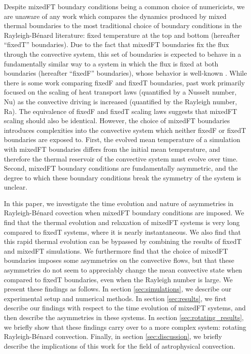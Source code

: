 \documentclass[aps, pre, onecolumn, nofootinbib, notitlepage, groupedaddress, amsfonts, amssymb, amsmath, longbibliography]{revtex4-1}
\newcommand{\RB}{Rayleigh-B\'{e}nard }
\begin{document}
Despite mixedFT boundary conditions being a common choice of numericists, we are unaware of any work which compares the dynamics produced by mixed thermal boundaries to the most traditional choice of boundary conditions in the \RB literature: fixed temperature at the top and bottom (hereafter ``fixedT'' boundaries).
Due to the fact that mixedFT boundaries fix the flux through the convective system, this set of boundaries is expected to behave in a fundamentally similar way to a system in which the flux is fixed at both boundaries (hereafter ``fixedF'' boundaries), whose behavior is well-known \cite{otero&all2002, goluskin2015}.
While there is some work \cite{johnston&doering2009} comparing fixedF and fixedT boundaries, past work primarily focused on the scaling of heat transport laws (quantified by a Nusselt number, Nu) as the convective driving is increased (quantified by the Rayleigh number, Ra).
The equivalence of fixedF and fixedT scaling laws suggests that mixedFT scaling should also be identical.
However, the choice of mixedFT boundaries introduces complexities into the convective system which neither fixedF or fixedT boundaries are exposed to.
First, the evolved mean temperature of a simulation with mixedFT boundaries differs from the initial mean temperature, and therefore the thermal reservoir of the convective system must evolve over time.
Second, mixedFT boundary conditions are fundamentally asymmetric, and the degree to which these boundary conditions break the symmetry of the system is unclear.

In this paper, we investigate the time evolution and nature of asymmetries in \RB covection when mixedFT boundary conditions are imposed.
We find that the thermal evolution and relaxation of mixedFT systems is very long compared to fixedT systems, where it is nearly instantaneous.
We also find that this rapid thermal evolution can be bypassed by combining the results of fixedT and mixedFT simulations.
We furthermore find that the choice of mixedFT boundaries imposes some asymmetries on the convective flows, but that these asymmetries do not seem to appreciably change the mean convective state when compared to fixedT boundaries, even when the Rayleigh number is large.
We present these findings as follows.
In section \ref{sec:simulations}, we describe our experimental setup and numerical methods.
In section \ref{sec:results}, we first describe our findings with respect to the time evolution of mixedFT systems, and then describe the asymmetries in these systems.
In section \ref{sec:rotating_results}, we briefly show that these findings carry over to a more complex system: rotating \RB convection.
Finally, in section \ref{sec:discussion}, we briefly describe the implications of this work for the field of astrophysical convection.
\end{document}

